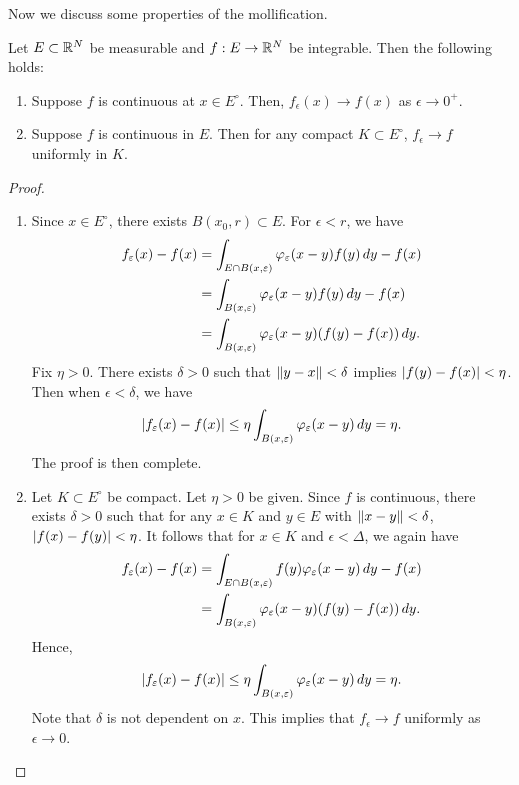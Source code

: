 \documentclass[a4paper]{article}
\begin{document}
Now we discuss some properties of the mollification.

\begin{thm}
  Let $E \subset \mathbb{R}^N$ be measurable and $f : E \to \mathbb{R}^N$ be integrable.
  Then the following holds:
  \begin{enumerate}
    \item Suppose $f$ is continuous at $x \in E^\circ$. Then, $f_\epsilon
          (x) \to f(x)$ as $\epsilon \to 0^+$.
    \item Suppose $f$ is continuous in $E$. Then for any compact $K
          \subset E^\circ$, $f_\epsilon \to f$ uniformly in $K$.
  \end{enumerate}
\end{thm}

\begin{proof}
  \begin{enumerate}
    \item Since $x \in E^\circ$, there exists $B(x_0, r) \subset E$. For
          $\epsilon < r$, we have
          \begin{align*}
            f_\varepsilon (x) - f(x)
             & = \int_{E \cap B(x, \varepsilon)} \varphi_\varepsilon (x - y) f(y) \, d y - f(x) \\
             & = \int_{B(x, \varepsilon)} \varphi_\varepsilon (x - y) f(y) \, d y - f (x)       \\
             & = \int_{B(x, \varepsilon)} \varphi_\varepsilon(x - y) (f(y) - f(x)) \, d y.
          \end{align*}
          Fix $\eta > 0$. There exists $\delta > 0$ such that $\left\lVert y - x\right\rVert <
            \delta$ implies $\left\lvert f(y) - f(x)\right\rvert < \eta$. Then when $\epsilon <
            \delta$, we have
          \begin{align*}
            \left\lvert f_\varepsilon (x) - f(x)\right\rvert
            \leq \eta \int_{B(x, \varepsilon)} \varphi_\varepsilon (x - y) \, d y
            = \eta.
          \end{align*}
          The proof is then complete.
    \item Let $K \subset E^\circ$ be compact. Let $\eta > 0$ be given.
          Since $f$ is continuous, there exists $\delta > 0$ such that for
          any $x \in K$ and $y \in E$ with $\left\lVert x - y\right\rVert < \delta$,
          $\left\lvert f(x) - f(y)\right\rvert < \eta$. It follows that for $x \in K$ and
          $\epsilon < \Delta$, we again have
          \begin{align*}
            f_\varepsilon(x) - f(x)
             & = \int_{E \cap B(x, \varepsilon)} f(y) \varphi_\varepsilon (x - y) \, d y - f(x) \\
             & = \int_{B (x, \varepsilon)} \varphi_\varepsilon(x - y) (f(y) - f(x)) \, d y.
          \end{align*}
          Hence,
          \[
            \left\lvert f_\varepsilon (x) - f(x)\right\rvert
            \leq \eta \int_{B(x, \varepsilon)} \varphi_\varepsilon (x - y) \, d y
            = \eta.
          \]
          Note that $\delta$ is not dependent on $x$. This implies that
          $f_\epsilon \to f$ uniformly as $\epsilon \to 0$.
  \end{enumerate}
\end{proof}
\end{document}
